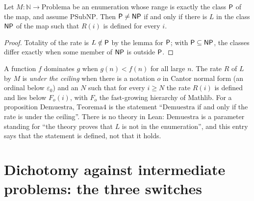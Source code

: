 \begin{theorem}
  \label{thm:structure-pnp-tasa}
  \leanok
  Let $M : \mathbb{N} \to \mathrm{Problema}$ be an enumeration whose range is exactly the class $\mathsf{P}$ of
  the map, and assume $\mathrm{PSubNP}$. Then $\mathsf{P} \neq \mathsf{NP}$ if and only if there is $L$ in the class
  $\mathsf{NP}$ of the map such that $R(i)$ is defined for every $i$.
\end{theorem}

\begin{proof}
  \leanok
  Totality of the rate is $L \notin \mathsf{P}$ by the lemma for $\mathsf{P}$; with $\mathsf{P} \subseteq \mathsf{NP}$,
  the classes differ exactly when some member of $\mathsf{NP}$ is outside $\mathsf{P}$.
\end{proof}

\begin{definition}
  \label{def:structure-teorema4}
  \leanok
  A function $f$ dominates $g$ when $g(n) < f(n)$ for all large $n$. The rate $R$ of $L$ by $M$ is
  \emph{under the ceiling} when there is a notation $o$ in Cantor normal form (an ordinal below
  $\varepsilon_0$) and an $N$ such that for every $i \ge N$ the rate $R(i)$ is defined and lies below
  $F_o(i)$, with $F_o$ the fast-growing hierarchy of Mathlib. For a proposition $\mathrm{Demuestra}$,
  $\mathrm{Teorema4}$ is the statement ``$\mathrm{Demuestra}$ if and only if the rate is under the
  ceiling''. There is no theory in Lean: $\mathrm{Demuestra}$ is a parameter standing for ``the theory
  proves that $L$ is not in the enumeration'', and this entry says that the statement is defined, not
  that it holds.
\end{definition}

\section{Dichotomy against intermediate problems: the three switches}
\label{sec:structure-switches}

